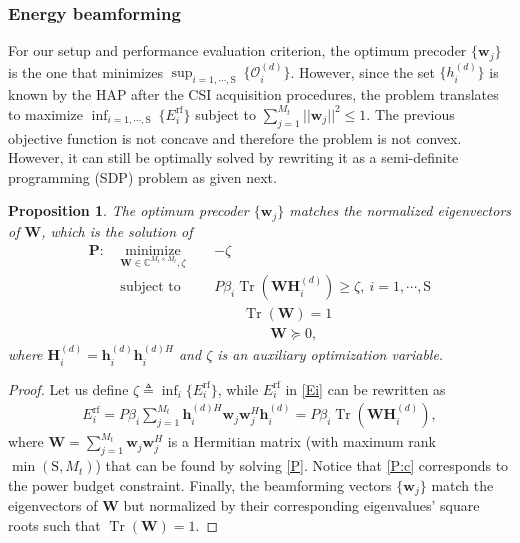 \documentclass[10pt,journal,a4paper]{IEEEtran}
\DeclareMathOperator{\Tr}{Tr}
\newtheorem{proposition}{Proposition}
\begin{document}
	\subsubsection{Energy beamforming}
	For our setup and performance evaluation criterion, the optimum precoder $\{\mathbf{w}_j\}$ is the one that minimizes $\sup_{i=1,\cdots,\mathrm{S}}\ \{\mathcal{O}_i^{(d)}\}$. However, since the set $\{h_i^{(d)}\}$ is  known by the HAP after the CSI acquisition procedures, the problem translates to maximize $\inf_{i=1,\cdots,\mathrm{S}}\ \{E_i^\mathrm{rf}\}$ subject to $\sum_{j=1}^{M_t}||\mathbf{w}_j||^2\le 1$. The previous objective function is not concave and therefore the problem is not convex. However, it
	can still be optimally solved by rewriting it as a semi-definite programming (SDP) problem \cite{Thudugalage.2016} as given next.
	\begin{proposition}
		The optimum precoder $\{\mathbf{w}_j\}$ matches the normalized eigenvectors of $\mathbf{W}$, which is the solution of
		\begin{subequations}\label{P}
			\begin{alignat}{2}
			\mathbf{P:}\  &\underset{\mathbf{W}\in\mathbb{C}^{M_t\times M_t}, \zeta}{\mathrm{minimize}}       &\ \ & 
			-\zeta \label{P:a}\\ 
			&\text{subject to} & &  P\beta_i\Tr(\mathbf{W}\mathbf{H}_i^{(d)})\ge \zeta, \  i\!=\!1,\cdots,\mathrm{S} \label{P:b}\\ 
			& & &\qquad \Tr(\mathbf{W})= 1 \label{P:c}\\ 
			& & &\qquad\qquad \mathbf{W}\succeq 0, \label{P12:d}
			\end{alignat}	
		\end{subequations}
	    where  $\mathbf{H}_i^{(d)}=\mathbf{h}_i^{(d)}\mathbf{h}_i^{(d)H}$ and $\zeta$ is an auxiliary optimization variable.
	\end{proposition}
%
	\begin{proof}
		Let us define $\zeta \triangleq \inf_{i} \{E_i^\mathrm{rf}\}$, while $E_i^\mathrm{rf}$ in \eqref{Ei} can be rewritten as
		\begin{align}
		E_i^\mathrm{rf}=P\beta_i\sum_{j=1}^{M_t}\mathbf{h}_i^{(d)H}\mathbf{w}_j\mathbf{w}_j^H\mathbf{h}_i^{(d)}=P\beta_i\Tr(\mathbf{W}\mathbf{H}_i^{(d)}),\label{Ei2}
		\end{align}
		where $\mathbf{W}=\sum_{j=1}^{M_t}\mathbf{w}_j\mathbf{w}_j^H$ is a Hermitian matrix (with maximum rank $\min (\mathrm{S},M_t)$) that can be found by solving \eqref{P}. Notice that  \eqref{P:c} corresponds to the power budget constraint. Finally, the beamforming vectors $\{\mathbf{w}_j\}$ match the eigenvectors of $\mathbf{W}$ but normalized by their corresponding eigenvalues' square roots such that $\Tr(\mathbf{W})=1$.
	\end{proof}
\end{document}
